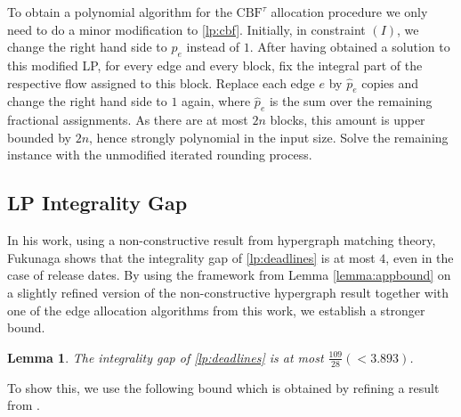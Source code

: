 \documentclass[11pt]{article}
\newtheorem{lemma}[theorem]{Lemma}
\begin{document}
To obtain a polynomial algorithm for the $\mathrm{CBF}^\tau$ allocation procedure we only need to do a minor modification to \ref{lp:cbf}. Initially, in constraint $(I)$, we change the right hand side to $p_e$ instead of $1$. After having obtained a solution to this modified LP, for every edge and every block, fix the integral part of the respective flow assigned to this block. Replace each edge $e$ by $\hat{p}_e$ copies and change the right hand side to $1$ again, where $\hat{p}_e$ is the sum over the remaining fractional assignments. As there are at most $2n$ blocks, this amount is upper bounded by $2n$, hence strongly polynomial in the input size. Solve the remaining instance with the unmodified iterated rounding process.

\subsection{LP Integrality Gap}\label{sec:app:lpintgap}
In his work, using a non-constructive result from hypergraph matching theory, Fukunaga \cite{fukunaga22} shows that the integrality gap of \ref{lp:deadlines} is at most $4$, even in the case of release dates. By using the framework from Lemma \ref{lemma:appbound} on a slightly refined version of the non-constructive hypergraph result together with one of the edge allocation algorithms from this work, we establish a stronger bound.

\begin{lemma}\label{lemma:lpintgap}
The integrality gap of \ref{lp:deadlines} is at most $\frac{109}{28}(<3.893)$.
\end{lemma}

\noindent To show this, we use the following bound which is obtained by refining a result from \cite{fukunaga22}.
\end{document}
